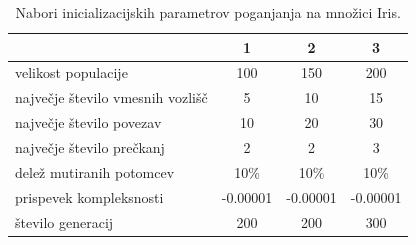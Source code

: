 \begin{table}[H]
    \begin{center}
        \begin{tabular}{||l c c c||}
            \hline
            & 1        & 2        & 3 \\ [0.5ex]
            \hline
            velikost populacije              & 100      & 150      & 200      \\
            \hline
            največje število vmesnih vozlišč & 5        & 10       & 15       \\
            \hline
            največje število povezav         & 10       & 20       & 30       \\
            \hline
            največje število prečkanj        & 2        & 2        & 3        \\
            \hline
            delež mutiranih potomcev         & 10\%     & 10\%     & 10\%     \\
            \hline
            prispevek kompleksnosti          & -0.00001 & -0.00001 & -0.00001 \\
            \hline
            število generacij                & 200      & 200      & 300      \\
            \hline
        \end{tabular}
    \end{center}
    \caption{Nabori inicializacijskih parametrov poganjanja na množici Iris.}
    \label{tab:param_iris}
\end{table}

